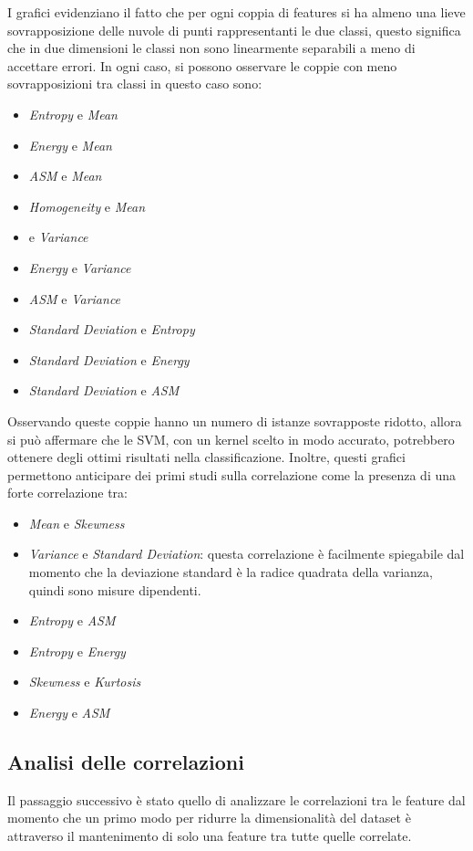 I grafici evidenziano il fatto che per ogni coppia di features si ha almeno una
lieve sovrapposizione delle nuvole di punti rappresentanti le due classi, questo
significa che in due dimensioni le classi non sono linearmente separabili a meno
di accettare errori. In ogni caso, si possono osservare le coppie con
meno sovrapposizioni tra classi in questo caso sono:
\begin{itemize}
      \item \textit{Entropy} e \textit{Mean}
      \item \textit{Energy} e \textit{Mean}
      \item \textit{ASM} e \textit{Mean}
      \item \textit{Homogeneity} e \textit{Mean}
      \item {} e \textit{Variance}
      \item \textit{Energy} e \textit{Variance}
      \item \textit{ASM} e \textit{Variance}
      \item \textit{Standard Deviation} e \textit{Entropy}
      \item \textit{Standard Deviation} e \textit{Energy}
      \item \textit{Standard Deviation} e \textit{ASM}
\end{itemize}
Osservando queste coppie hanno un numero di istanze sovrapposte ridotto, allora
si può affermare che le SVM, con un kernel scelto in modo accurato, potrebbero
ottenere degli ottimi risultati nella classificazione. Inoltre, questi grafici
permettono anticipare dei primi studi sulla correlazione come la presenza di una
forte correlazione tra:
\begin{itemize}
      \item \textit{Mean} e \textit{Skewness}
      \item \textit{Variance} e \textit{Standard Deviation}: questa correlazione
            è facilmente spiegabile dal momento che la deviazione standard è la
            radice quadrata della varianza, quindi sono misure dipendenti.
      \item \textit{Entropy} e \textit{ASM}
      \item \textit{Entropy} e \textit{Energy}
      \item \textit{Skewness} e \textit{Kurtosis}
      \item \textit{Energy} e \textit{ASM}
\end{itemize}
\subsection{Analisi delle correlazioni} \label{sec:correlazione}
Il passaggio successivo è  stato quello di analizzare le correlazioni tra le
feature dal momento che un primo modo per ridurre la dimensionalità del dataset
è attraverso il mantenimento di solo una feature tra tutte quelle correlate.

